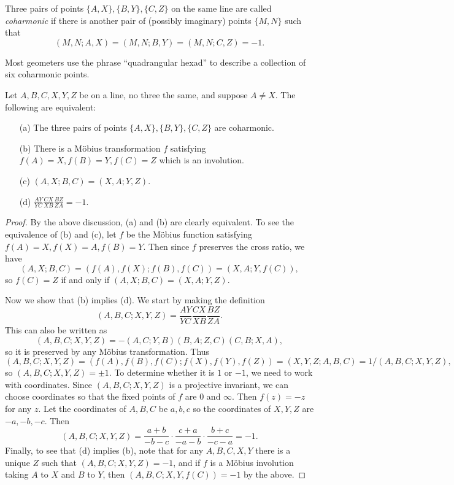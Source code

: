 \begin{defn} Three pairs of points $\{A,X\}, \{B,Y\}, \{C,Z\}$ on the same line are called \emph{coharmonic} if there is another pair of (possibly imaginary) points $\{M,N\}$ such that
\[
(M,N;A,X) = (M,N;B,Y) = (M,N;C,Z) = -1.
\]
\end{defn}

\begin{rem} Most geometers use the phrase ``quadrangular hexad'' to describe a collection of six coharmonic points.
\end{rem}

\begin{thm}\label{coharmonic} Let $A,B,C,X,Y,Z$ be on a line, no three the same, and suppose $A\ne X$. The following are equivalent:
\begin{itemize}
\item[\rm (a)] The three pairs of points $\{A,X\}, \{B,Y\}, \{C,Z\}$ are coharmonic.
\item[\rm (b)] There is a M\"obius transformation $f$ satisfying $f(A) = X, f(B) = Y, f(C) = Z$ which is an involution.
\item[\rm (c)] $(A,X;B,C) = (X,A;Y,Z)$.
\item[\rm (d)] $\frac{AY}{YC}\frac{CX}{XB}\frac{BZ}{ZA} = -1$.
\end{itemize}
\end{thm}
\begin{proof} By the above discussion, (a) and (b) are clearly equivalent. To see the equivalence of (b) and (c), let $f$ be the M\"obius function satisfying $f(A) = X, f(X) = A, f(B) = Y$. Then since $f$ preserves the cross ratio, we have
\[
(A,X;B,C) = (f(A),f(X);f(B),f(C)) = (X,A;Y,f(C)),
\]
so $f(C) = Z$ if and only if $(A,X;B,C) = (X,A;Y,Z)$.

Now we show that (b) implies (d). We start by making the definition
\[
(A,B,C;X,Y,Z) = \frac{AY}{YC}\frac{CX}{XB}\frac{BZ}{ZA}.
\]
This can also be written as
\[
(A,B,C;X,Y,Z) = -(A,C;Y,B)(B,A;Z,C)(C,B;X,A),
\]
so it is preserved by any M\"obius transformation. Thus
\[
(A,B,C;X,Y,Z) = (f(A),f(B),f(C);f(X),f(Y),f(Z)) = (X,Y,Z;A,B,C) = 1/(A,B,C;X,Y,Z),
\]
so $(A,B,C;X,Y,Z) = \pm 1$. To determine whether it is $1$ or $-1$, we need to work with coordinates. Since $(A,B,C;X,Y,Z)$ is a projective invariant, we can choose coordinates so that the fixed points of $f$ are $0$ and $\infty$. Then $f(z) = -z$ for any $z$. Let the coordinates of $A,B,C$ be $a,b,c$ so the coordinates of $X,Y,Z$ are $-a, -b, -c$. Then
\[
(A,B,C;X,Y,Z) = \frac{a+b}{-b-c}\cdot\frac{c+a}{-a-b}\cdot\frac{b+c}{-c-a} = -1.
\]
Finally, to see that (d) implies (b), note that for any $A,B,C,X,Y$ there is a unique $Z$ such that $(A,B,C;X,Y,Z) = -1$, and if $f$ is a M\"obius involution taking $A$ to $X$ and $B$ to $Y$, then $(A,B,C;X,Y,f(C)) = -1$ by the above.
\end{proof}

